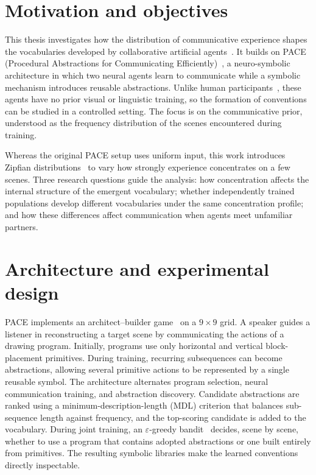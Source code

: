 \documentclass[%
    12pt, %
    oneside, %
    a4paper, %
    notitlepage, %
]{article}
\begin{document}




\maketitle

\section*{Motivation and objectives}

This thesis investigates how the distribution of communicative experience shapes the vocabularies developed by collaborative artificial agents~\cite{lazaridou_emergent_2020}. It builds on PACE (Procedural Abstractions for Communicating Efficiently)~\cite{thomas_pace_2025}, a neuro-symbolic architecture in which two neural agents learn to communicate while a symbolic mechanism introduces reusable abstractions. Unlike human participants~\cite{mccarthy_learning_2021}, these agents have no prior visual or linguistic training, so the formation of conventions can be studied in a controlled setting. The focus is on the communicative prior, understood as the frequency distribution of the scenes encountered during training.

Whereas the original PACE setup uses uniform input, this work introduces Zipfian distributions~\cite{zipf_human_1949} to vary how strongly experience concentrates on a few scenes. Three research questions guide the analysis: how concentration affects the internal structure of the emergent vocabulary; whether independently trained populations develop different vocabularies under the same concentration profile; and how these differences affect communication when agents meet unfamiliar partners.

\section*{Architecture and experimental design}

PACE implements an architect--builder game~\cite{mccarthy_learning_2021} on a $9\times9$ grid. A speaker guides a listener in reconstructing a target scene by communicating the actions of a drawing program. Initially, programs use only horizontal and vertical block-placement primitives. During training, recurring subsequences can become abstractions, allowing several primitive actions to be represented by a single reusable symbol. The architecture alternates program selection, neural communication training, and abstraction discovery. Candidate abstractions are ranked using a minimum-description-length (MDL) criterion that balances sub-sequence length against frequency, and the top-scoring candidate is added to the vocabulary. During joint training, an $\varepsilon$-greedy bandit~\cite{sutton_reinforcement_1998} decides, scene by scene, whether to use a program that contains adopted abstractions or one built entirely from primitives. The resulting symbolic libraries make the learned conventions directly inspectable.
\end{document}
